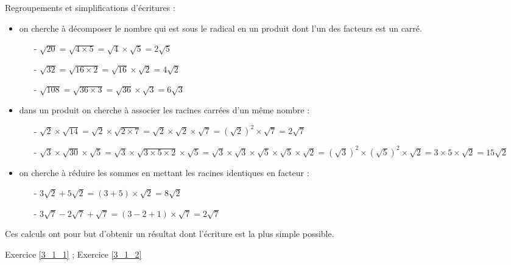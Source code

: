 \begin{methode}{}{}
Regroupements et simplifications d'écritures :

\begin{itemize}
\item  on cherche à décomposer le nombre qui est sous le radical en un produit dont l'un des facteurs est un carré.
\begin{itemize}
\item[-]$\sqrt{20} = \sqrt{4\times 5} = \sqrt{4} \times \sqrt{5} = 2\sqrt{5}$
\item[-]$\sqrt{32} = \sqrt{16\times 2} = \sqrt{16} \times \sqrt{2} = 4\sqrt{2}$
\item[-]$\sqrt{108} = \sqrt{36\times 3} = \sqrt{36} \times \sqrt{3} = 6\sqrt{3}$
\end{itemize}
\item dans un produit on cherche à associer les racines carrées d'un même nombre :
\begin{itemize}
\item[-]$\sqrt{2}\times \sqrt{14} = \sqrt{2}\times \sqrt{2\times 7} = \sqrt{2}\times \sqrt{2}\times \sqrt{7} = \left(\sqrt{2}\right)^2 \times \sqrt{7} = 2 \sqrt{7}$
\item[-]$\sqrt{3}\times \sqrt{30} \times \sqrt{5}= \sqrt{3}\times \sqrt{3\times 5\times 2} \times \sqrt{5}= \sqrt{3}\times \sqrt{3}\times \sqrt{5} \times \sqrt{5}\times \sqrt{2}= \left(\sqrt{3}\right)^2 \times \left(\sqrt{5}\right)^2 \times \sqrt{2} = 3 \times 5 \times \sqrt{2} = 15\sqrt{2}$
\end{itemize}
\item on cherche à réduire les sommes en mettant les racines identiques en facteur :
\begin{itemize}
\item[-]$3\sqrt{2}+5\sqrt{2} = (3+5)\times \sqrt{2} = 8\sqrt{2}$
\item[-]$3\sqrt{7}-2\sqrt{7} +\sqrt{7}= (3-2+1)\times \sqrt{7} = 2\sqrt{7}$
\end{itemize}
\end{itemize}
Ces calculs ont pour but d'obtenir un résultat dont l'écriture est la plus simple possible.
\end{methode}


\begin{exec}
\hspace{0.5cm} \hypertarget{Ex_3_1_1}{} Exercice \ref{3_1_1} \hspace{0.5cm};
\hspace{0.5cm} \hypertarget{Ex_3_1_2}{}  Exercice \ref{3_1_2} \hspace{0.5cm}
\end{exec}

